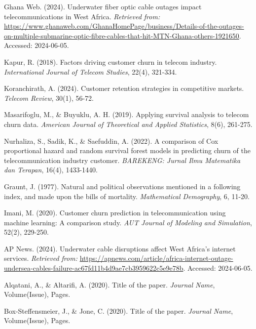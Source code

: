 \documentclass[doublespacing,12pt]{report}
\begin{document}
{\begin{enumerate}[label=\textbf{[\arabic*]}]
\item Ghana Web. (2024). Underwater fiber optic cable outages impact telecommunications in West Africa. \textit{Retrieved from:} \url{https://www.ghanaweb.com/GhanaHomePage/business/Details-of-the-outages-on-multiple-submarine-optic-fibre-cables-that-hit-MTN-Ghana-others-1921650}. Accessed: 2024-06-05.

\item Kapur, R. (2018). Factors driving customer churn in telecom industry. \textit{International Journal of Telecom Studies}, 22(4), 321-334.

\item Koranchirath, A. (2024). Customer retention strategies in competitive markets. \textit{Telecom Review}, 30(1), 56-72.

\item Masarifoglu, M., \& Buyuklu, A. H. (2019). Applying survival analysis to telecom churn data. \textit{American Journal of Theoretical and Applied Statistics}, 8(6), 261-275.

\item Nurhaliza, S., Sadik, K., \& Saefuddin, A. (2022). A comparison of Cox proportional hazard and random survival forest models in predicting churn of the telecommunication industry customer. \textit{BAREKENG: Jurnal Ilmu Matematika dan Terapan}, 16(4), 1433-1440.

\item Graunt, J. (1977). Natural and political observations mentioned in a following index, and made upon the bills of mortality. \textit{Mathematical Demography}, 6, 11-20.

\item Imani, M. (2020). Customer churn prediction in telecommunication using machine learning: A comparison study. \textit{AUT Journal of Modeling and Simulation}, 52(2), 229-250.

\item AP News. (2024). Underwater cable disruptions affect West Africa's internet services. \textit{Retrieved from:} \url{https://apnews.com/article/africa-internet-outage-undersea-cables-failure-ac67fd11b4d9ae7cb3959622c5e9e78b}. Accessed: 2024-06-05.

\item Alqatani, A., \& Altarifi, A. (2020). Title of the paper. \textit{Journal Name}, Volume(Issue), Pages.

\item Box-Steffensmeier, J., \& Jone, C. (2020). Title of the paper. \textit{Journal Name}, Volume(Issue), Pages.


\end{enumerate}}
\end{document}
